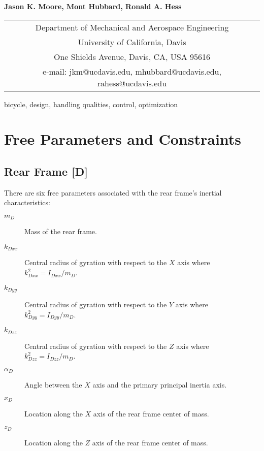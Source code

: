 \documentclass{icsc}
\begin{document}
\begin{center}
\end{center}

\begin{center}
  \normalsize{\bf{Jason K. Moore, Mont Hubbard,  Ronald A. Hess}}
\end{center}

\begin{center}
  \begin{tabular}{c}
    Department of Mechanical and Aerospace Engineering\\
    University of California, Davis\\
    One Shields Avenue, Davis, CA, USA 95616\\
    e-mail: jkm@ucdavis.edu, mhubbard@ucdavis.edu, rahess@ucdavis.edu\\
  \end{tabular}
\end{center}

\begin{keywords}
  bicycle,
  design,
  handling qualities,
  control,
  optimization
\end{keywords}

\appendix

\section{Free Parameters and Constraints}

\subsection{Rear Frame [D]}

There are six free parameters associated with the rear frame's inertial characteristics:

\begin{description}
  \item[$m_D$] Mass of the rear frame.
  \item[$k_{Dxx}$] Central radius of gyration with respect to the $X$ axis where $k_{Dxx}^2=I_{Dxx} / m_D$.
  \item[$k_{Dyy}$] Central radius of gyration with respect to the $Y$ axis where $k_{Dyy}^2=I_{Dyy} / m_D$.
  \item[$k_{Dzz}$] Central radius of gyration with respect to the $Z$ axis where $k_{Dzz}^2=I_{Dzz} / m_D$.
  \item[$\alpha_D$] Angle between the $X$ axis and the primary principal inertia axis.
  \item[$x_D$] Location along the $X$ axis of the rear frame center of mass.
  \item[$z_D$] Location along the $Z$ axis of the rear frame center of mass.
\end{description}
\end{document}
